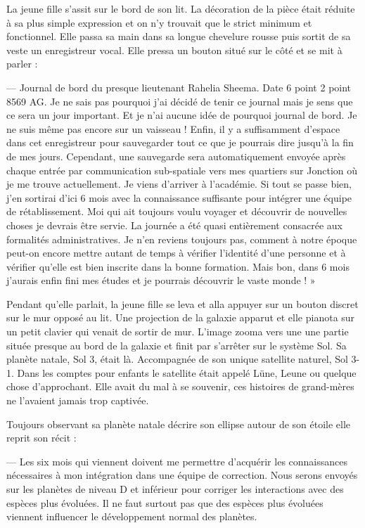 La jeune fille s'assit sur le bord de son lit. La décoration de la pièce était
réduite à sa plus simple expression et on n'y trouvait que le strict minimum et
fonctionnel. Elle passa sa main dans sa longue chevelure rousse puis sortit de
sa veste un enregistreur vocal. Elle pressa un bouton situé sur le côté et se
mit à parler :

— Journal de bord du presque lieutenant Rahelia Sheema. Date 6 point 2 point
8569 AG. Je ne sais pas pourquoi j'ai décidé de tenir ce journal mais je sens
que ce sera un jour important. Et je n'ai aucune idée de pourquoi journal de
bord. Je ne suis même pas encore sur un vaisseau ! Enfin, il y a suffisamment
d'espace dans cet enregistreur pour sauvegarder tout ce que je pourrais dire
jusqu'à la fin de mes jours. Cependant, une sauvegarde sera automatiquement
envoyée après chaque entrée par communication sub-spatiale vers mes quartiers
sur Jonction où je me trouve actuellement. Je viens d'arriver à l'académie. Si
tout se passe bien, j'en sortirai d'ici 6 mois avec la connaissance suffisante
pour intégrer une équipe de rétablissement. Moi qui ait toujours voulu voyager
et découvrir de nouvelles choses je devrais être servie. La journée a été quasi
entièrement consacrée aux formalités administratives. Je n'en reviens toujours
pas, comment à notre époque peut-on encore mettre autant de temps à vérifier
l'identité d'une personne et à vérifier qu'elle est bien inscrite dans la bonne
formation. Mais bon, dans 6 mois j'aurais enfin fini mes études et je pourrais
découvrir le vaste monde ! »

Pendant qu'elle parlait, la jeune fille se leva et alla appuyer sur un bouton
discret sur le mur opposé au lit. Une projection de la galaxie apparut et elle
pianota sur un petit clavier qui venait de sortir de mur. L'image zooma vers une
une partie située presque au bord de la galaxie et finit par s'arrêter sur le
système Sol. Sa planète natale, Sol 3, était là. Accompagnée de son unique
satellite naturel, Sol 3-1. Dans les comptes pour enfants le satellite était
appelé Lüne, Leune ou quelque chose d'approchant. Elle avait du mal à se
souvenir, ces histoires de grand-mères ne l'avaient jamais trop captivée.

Toujours observant sa planète natale décrire son ellipse autour de son étoile
elle reprit son récit :

— Les six mois qui viennent doivent me permettre d'acquérir les connaissances
nécessaires à mon intégration dans une équipe de correction. Nous serons envoyés
sur les planètes de niveau D et inférieur pour corriger les interactions avec
des espèces plus évoluées. Il ne faut surtout pas que des espèces plus évoluées
viennent influencer le développement normal des planètes.

